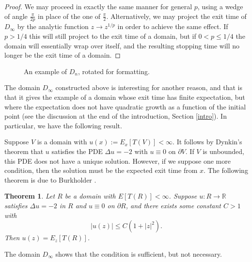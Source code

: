 \documentclass[a4paper, oneside, 12pt]{amsart}
\newcommand{\RR}{\mathbb{R}}
\newtheorem{theorem}{Theorem}[section]
\begin{document}
\begin{proof}
We may proceed in exactly the same manner for general $p$, using a wedge of angle $\frac{\pi}{2p}$ in place of the one of $\frac{\pi}{2}$. Alternatively, we may project the exit time of $D_\infty$ by the analytic function $z \to z^{1/p}$ in order to achieve the same effect. If $p>1/4$ this will still project to the exit time of a domain, but if $0 < p \leq 1/4$ the domain will essentially wrap over itself, and the resulting stopping time will no longer be the exit time of a domain. 
\end{proof}


\begin{figure}[H] 
\begin{center}

\caption{An example of $D_n$, rotated for formatting.}\label{growing wedges}
\end{center}
\end{figure}

The domain $D_\infty$ constructed above is interesting for another reason, and that is that it gives the example of a domain whose exit time has finite expectation, but where the expectation does not have quadratic growth as a function of the initial point (see the discussion at the end of the introduction, Section \ref{intro}). In particular, we have the following result.

 Suppose $V$
is a domain with $u(x) := E_x[T(V)] <\infty$. It follows by Dynkin's theorem that $u$ satisfies
the PDE $\Delta u = -2$ with $u\equiv0$ on $\partial V$. If $V$ is unbounded, this PDE does not
have a unique solution. However, if we suppose one more condition, then the solution must be the
expected exit time from $x$. The following theorem is due to Burkholder \cite{burk}.
\begin{theorem}
    Let $R$ be a domain with $E[T(R)]< \infty$. Suppose $u:R\to\RR$ satisfies $\Delta u = -2$
    in $R$ and $u\equiv 0$ on $\partial R$, and there exists some constant $C>1$ with
    $$
        |u(z)| \leq C(1+|z|^2).
    $$
    Then $u(z) = E_z[T(R)]$.
\end{theorem}
The domain $D_\infty$ shows that the condition is sufficient, but not necessary. 
\fi
\end{document}
